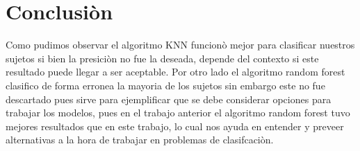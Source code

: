 \section{Conclusi\`on}
Como pudimos observar el algoritmo KNN funcionò mejor para clasificar nuestros sujetos si bien
la presiciòn no fue la deseada, depende del contexto si este resultado puede llegar a ser aceptable.
Por otro lado el algoritmo random forest clasifico de forma erronea la mayoria de los sujetos sin
embargo este no fue descartado pues sirve para ejemplificar que se debe considerar opciones para
trabajar los modelos, pues en el trabajo anterior el algoritmo random forest tuvo mejores resultados
que en este trabajo, lo cual nos ayuda en entender y preveer alternativas a la hora de trabajar en
problemas de clasifcaciòn.
